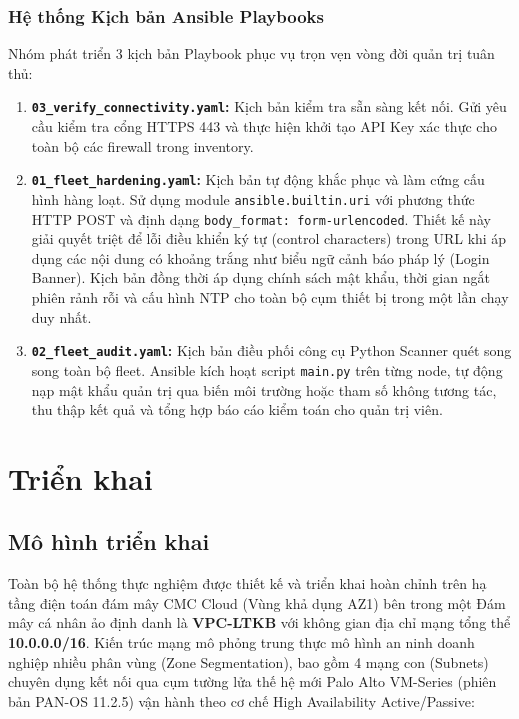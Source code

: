 \documentclass[12pt,a4paper]{article}
\begin{document}
\subsubsection{Hệ thống Kịch bản Ansible Playbooks}
Nhóm phát triển 3 kịch bản Playbook phục vụ trọn vẹn vòng đời quản trị tuân thủ:
\begin{enumerate}
    \item \textbf{\texttt{03\_verify\_connectivity.yaml}:} Kịch bản kiểm tra sẵn sàng kết nối. Gửi yêu cầu kiểm tra cổng HTTPS 443 và thực hiện khởi tạo API Key xác thực cho toàn bộ các firewall trong inventory.
    \item \textbf{\texttt{01\_fleet\_hardening.yaml}:} Kịch bản tự động khắc phục và làm cứng cấu hình hàng loạt. Sử dụng module \texttt{ansible.builtin.uri} với phương thức HTTP POST và định dạng \texttt{body\_format: form-urlencoded}. Thiết kế này giải quyết triệt để lỗi điều khiển ký tự (control characters) trong URL khi áp dụng các nội dung có khoảng trắng như biểu ngữ cảnh báo pháp lý (Login Banner). Kịch bản đồng thời áp dụng chính sách mật khẩu, thời gian ngắt phiên rảnh rỗi và cấu hình NTP cho toàn bộ cụm thiết bị trong một lần chạy duy nhất.
    \item \textbf{\texttt{02\_fleet\_audit.yaml}:} Kịch bản điều phối công cụ Python Scanner quét song song toàn bộ fleet. Ansible kích hoạt script \texttt{main.py} trên từng node, tự động nạp mật khẩu quản trị qua biến môi trường hoặc tham số không tương tác, thu thập kết quả và tổng hợp báo cáo kiểm toán cho quản trị viên.
\end{enumerate}

\section{Triển khai}

\subsection{Mô hình triển khai}

\noindent Toàn bộ hệ thống thực nghiệm được thiết kế và triển khai hoàn chỉnh trên hạ tầng điện toán đám mây CMC Cloud (Vùng khả dụng AZ1) bên trong một Đám mây cá nhân ảo định danh là \textbf{VPC-LTKB} với không gian địa chỉ mạng tổng thể \textbf{10.0.0.0/16}. Kiến trúc mạng mô phỏng trung thực mô hình an ninh doanh nghiệp nhiều phân vùng (Zone Segmentation), bao gồm 4 mạng con (Subnets) chuyên dụng kết nối qua cụm tường lửa thế hệ mới Palo Alto VM-Series (phiên bản PAN-OS 11.2.5) vận hành theo cơ chế High Availability Active/Passive:
\end{document}
